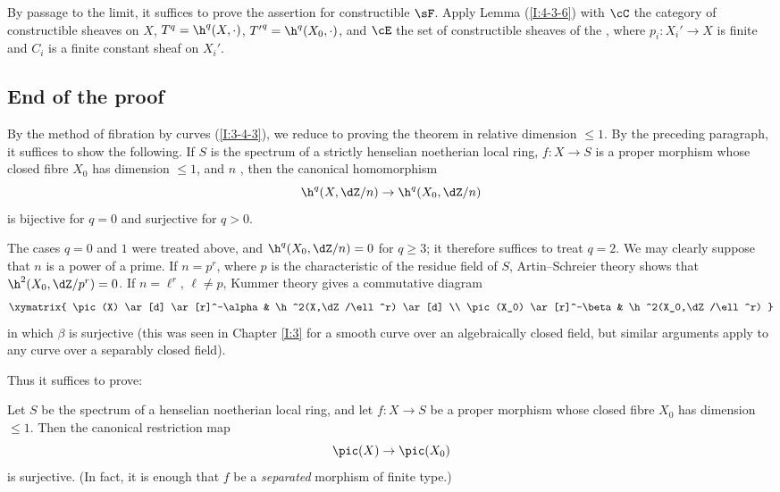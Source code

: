 By passage to the limit, it suffices to prove the assertion for
constructible $\sF$. Apply Lemma (\ref{I:4-3-6}) with $\cC$ the category
of constructible sheaves on $X$, $T^q=\h^q(X,\cdot)$,
${T'}^q=\h^q(X_0,\cdot)$, and $\cE$ the set of constructible sheaves of the
, where $p_i:X_i'\to X$ is finite and $C_i$ is a
finite constant sheaf on $X_i'$.

\subsection{End of the proof}\label{I:4-4}

By the method of fibration by curves (\ref{I:3-4-3}), we reduce to proving
the theorem in relative dimension $\leqslant1$. By the preceding
paragraph, it suffices to show the following. If $S$ is the spectrum of a
strictly henselian noetherian local ring, $f:X\to S$ is a proper
morphism whose closed fibre $X_0$ has dimension $\leqslant1$, and $n$
, then the canonical homomorphism
\[
  \h^q(X,\dZ/n) \to \h^q(X_0,\dZ/n)
\]
is bijective for $q=0$ and surjective for $q>0$.

The cases $q=0$ and $1$ were treated above, and
$\h^q(X_0,\dZ/n)=0$ for $q\geqslant3$; it therefore suffices to treat
$q=2$. We may clearly suppose that $n$ is a power of a prime. If
$n=p^r$, where $p$ is the characteristic of the residue field of $S$,
Artin--Schreier theory shows that $\h^2(X_0,\dZ/p^r)=0$. If
$n=\ell^r$, $\ell\ne p$, Kummer theory gives a commutative diagram
\[\xymatrix{
  \pic(X) \ar[d] \ar[r]^-\alpha
    & \h^2(X,\dZ/\ell^r) \ar[d] \\
  \pic(X_0) \ar[r]^-\beta
    & \h^2(X_0,\dZ/\ell^r)
}\]
in which $\beta$ is surjective (this was seen in Chapter \ref{I:3} for a
smooth curve over an algebraically closed field, but similar arguments
apply to any curve over a separably closed field).

Thus it suffices to prove:

\begin{proposition}\label{I:4-4-1}
Let $S$ be the spectrum of a henselian noetherian local ring, and let
$f:X\to S$ be a proper morphism whose closed fibre $X_0$ has dimension
$\leqslant1$. Then the canonical restriction map
\[
  \pic(X)\to \pic(X_0)
\]
is surjective. (In fact, it is enough that $f$ be a \emph{separated}
morphism of finite type.)
\end{proposition}

